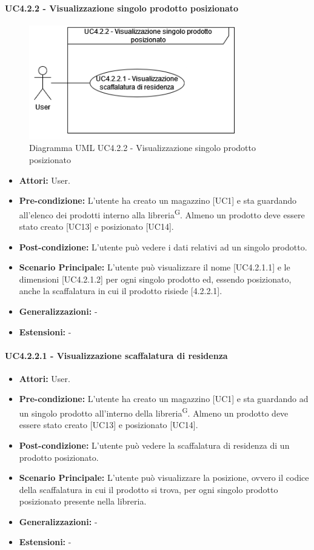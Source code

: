 \paragraph{UC4.2.2 - Visualizzazione singolo prodotto posizionato}
\begin{figure}[H]
  \centering
  \includegraphics[width=0.8\textwidth]{UC_diagrams_1-10/UC4.2.2.drawio.png}
   \caption{Diagramma UML UC4.2.2 - Visualizzazione singolo prodotto posizionato}
\end{figure}
\begin{itemize}
    \item \textbf{Attori:} User.
    \item \textbf{Pre-condizione:}  L'utente ha creato un magazzino [UC1] e sta guardando all'elenco dei prodotti interno alla libreria\textsuperscript{G}. Almeno un prodotto deve essere stato creato [UC13] e posizionato [UC14].
    \item \textbf{Post-condizione:}  L'utente può vedere i dati relativi ad un singolo prodotto.
    \item \textbf{Scenario Principale:}  L'utente può visualizzare il nome [UC4.2.1.1] e le dimensioni [UC4.2.1.2] per ogni singolo prodotto ed, essendo posizionato, anche la scaffalatura in cui il prodotto risiede [4.2.2.1]. 
    \item \textbf{Generalizzazioni:} -
    \item \textbf{Estensioni:} -
\end{itemize}


\paragraph{UC4.2.2.1 - Visualizzazione scaffalatura di residenza}
\begin{itemize} 
    \item \textbf{Attori:} User.
    \item \textbf{Pre-condizione:}  L'utente ha creato un magazzino [UC1] e sta guardando ad un singolo prodotto all'interno della libreria\textsuperscript{G}. Almeno un prodotto deve essere stato creato [UC13] e posizionato [UC14].
    \item \textbf{Post-condizione:} L'utente può vedere la scaffalatura di residenza di un prodotto posizionato.
    \item \textbf{Scenario Principale:} L'utente può visualizzare la posizione, ovvero il codice della scaffalatura in cui il prodotto si trova, per ogni singolo prodotto posizionato presente nella libreria. 
    \item \textbf{Generalizzazioni:} -
    \item \textbf{Estensioni:} -
\end{itemize}